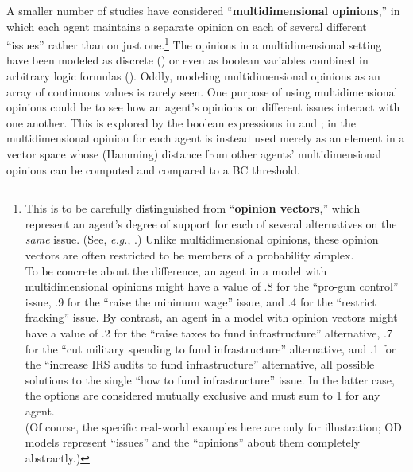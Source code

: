 A smaller number of studies have considered ``\textbf{multidimensional
opinions},'' in which each agent maintains a separate opinion on each of
several different ``issues'' rather than on just one.\footnote{This is to be
carefully distinguished from ``\textbf{opinion vectors},'' which represent an
agent's degree of support for each of several alternatives on the \textit{same}
issue. (See, \textit{e.g.}, \cite{sirbu_opinion_2013}.) Unlike multidimensional
opinions, these opinion vectors are often restricted to be members of a
probability simplex.\\\indent To be concrete about the difference, an agent in
a model with multidimensional opinions might have a value of .8 for the
``pro-gun control'' issue, .9 for the ``raise the minimum wage'' issue, and .4
for the ``restrict fracking'' issue. By contrast, an agent in a model with
opinion vectors might have a value of .2 for the ``raise taxes to fund
infrastructure'' alternative, .7 for the ``cut military spending to fund
infrastructure'' alternative, and .1 for the ``increase IRS audits to fund
infrastructure'' alternative, all possible solutions to the single ``how to
fund infrastructure'' issue. In the latter case, the options are considered
mutually exclusive and must sum to 1 for any agent.\\\indent (Of course, the
specific real-world examples here are only for illustration; OD models
represent ``issues'' and the ``opinions'' about them completely abstractly.)}
The opinions in a multidimensional setting have been modeled as discrete
(\cite{deffuant_mixing_2000}) or even as boolean variables combined in
arbitrary logic formulas (\cite{van_den_herik_modelling_2019,
cholvy_diffusion_2016}). Oddly, modeling multidimensional opinions as an array
of continuous values is rarely seen. One purpose of using multidimensional
opinions could be to see how an agent's opinions on different issues interact
with one another. This is explored by the boolean expressions in
\cite{van_den_herik_modelling_2019} and \cite{cholvy_diffusion_2016}; in
\cite{deffuant_mixing_2000} the multidimensional opinion for each agent is
instead used merely as an element in a vector space whose (Hamming) distance
from other agents' multidimensional opinions can be computed and compared to a
BC threshold.

